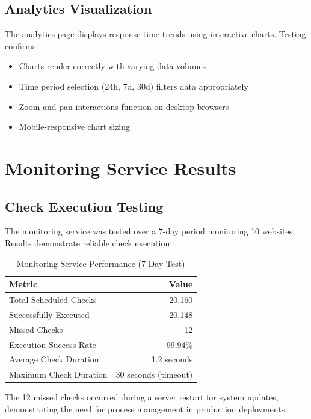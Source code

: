\subsection{Analytics Visualization}

The analytics page displays response time trends using interactive charts. Testing confirms:

\begin{itemize}
    \item Charts render correctly with varying data volumes
    \item Time period selection (24h, 7d, 30d) filters data appropriately
    \item Zoom and pan interactions function on desktop browsers
    \item Mobile-responsive chart sizing
\end{itemize}

\section{Monitoring Service Results}

\subsection{Check Execution Testing}

The monitoring service was tested over a 7-day period monitoring 10 websites. Results demonstrate reliable check execution:

\begin{table}[htbp]
    \centering
    \caption{Monitoring Service Performance (7-Day Test)}
    \label{tab:monitoring-results}
    \begin{tabular}{lr}
        \toprule
        \textbf{Metric} & \textbf{Value} \\
        \midrule
        Total Scheduled Checks & 20,160 \\
        Successfully Executed & 20,148 \\
        Missed Checks & 12 \\
        Execution Success Rate & 99.94\% \\
        Average Check Duration & 1.2 seconds \\
        Maximum Check Duration & 30 seconds (timeout) \\
        \bottomrule
    \end{tabular}
\end{table}

The 12 missed checks occurred during a server restart for system updates, demonstrating the need for process management in production deployments.

